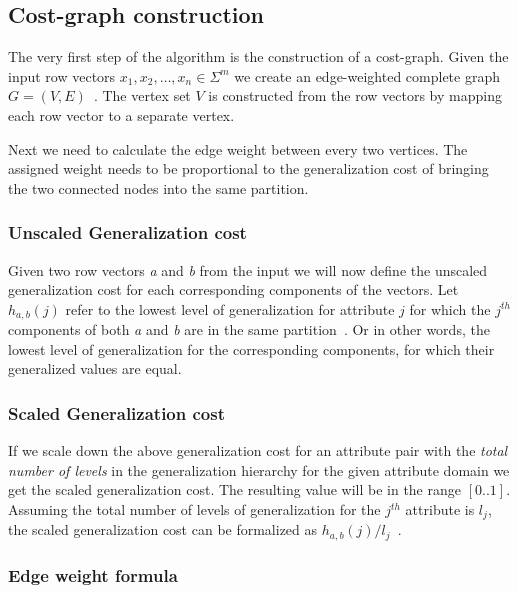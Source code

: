 \subsection{Cost-graph construction}\label{subsec:cost_graph_construction}

The very first step of the algorithm is the construction of a cost-graph.
Given the input row vectors \(x_1, x_2, \dots, x_n \in \Sigma^m\) we create an edge-weighted complete graph \(G = (V,E)\)~\cite{aggarwal}.
The vertex set \(V\) is constructed from the row vectors by mapping each row vector to a separate vertex.

Next we need to calculate the edge weight between every two vertices.
The assigned weight needs to be proportional to the generalization cost of bringing the two connected nodes into the same partition.

\subsubsection{Unscaled Generalization cost}

Given two row vectors \textit{a} and \textit{b} from the input we will now define the unscaled generalization cost for each corresponding components of the vectors.
Let \(h_{a,b}(j)\) refer to the lowest level of generalization for attribute \(j\) for which the \(j^{th}\) components of both \textit{a} and \textit{b} are in the same partition~\cite{aggarwal}.
Or in other words, the lowest level of generalization for the corresponding components, for which their generalized values are equal.

\subsubsection{Scaled Generalization cost}

If we scale down the above generalization cost for an attribute pair with the \textit{total number of levels} in the generalization hierarchy for the given attribute domain we get the scaled generalization cost.
The resulting value will be in the range \([0..1]\).
Assuming the total number of levels of generalization for the \(j^{th}\) attribute is \(l_j\), the scaled generalization cost can be formalized as \(h_{a,b}(j) / l_j\)~\cite{aggarwal}.

\subsubsection{Edge weight formula}

